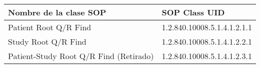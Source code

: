 \begin{tabular}{|l|l|}
\hline
\textbf{Nombre de la clase SOP}        & \textbf{SOP Class UID}      \\ \hline
Patient Root Q/R Find                  & 1.2.840.10008.5.1.4.1.2.1.1 \\ \hline
Study Root Q/R Find                    & 1.2.840.10008.5.1.4.1.2.2.1 \\ \hline
Patient-Study Root Q/R Find (Retirado) & 1.2.840.10008.5.1.4.1.2.3.1 \\ \hline
\end{tabular}
